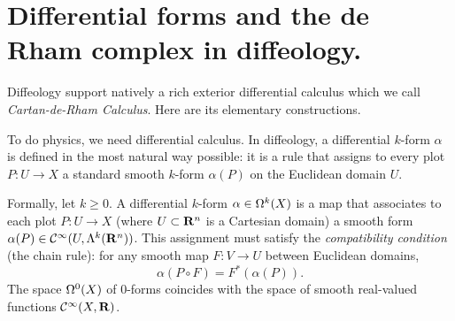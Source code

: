 \documentclass[10pt,reqno,letterpaper,twoside]{amsbook}
\begin{document}
  \section{Differential forms and the de Rham complex in diffeology.}
  \label{sec:Differential forms and the de Rham complex in diffeology}
  
  Diffeology support natively a rich exterior differential calculus which we call \emph{Cartan-de-Rham Calculus}.
  Here are its elementary constructions.
  
  \begin{article}
    To do physics,
    we need differential calculus.
    In diffeology,
    a differential $k$-form $\alpha$ is defined in the most natural way possible:
    it is a rule that assigns to every plot $P: U \to X$ a standard smooth $k$-form $\alpha(P)$ on the Euclidean domain $U$.
    
    Formally,
    let $k \geq 0$.
    A differential $k$-form $\alpha \in \Omega^k(X)$ is a map that associates to each plot $P: U \to X$ (where $U \subset {\mathbf{R}}^n$ is a Cartesian domain) a smooth form $\alpha(P) \in {\mathcal{C}}^\infty(U, \Lambda^k({\mathbf{R}}^n))$.
    This assignment must satisfy the \emph{compatibility condition} (the chain rule):
    for any smooth map $F: V \to U$ between Euclidean domains,
    \[
      \alpha(P \circ F) = F^*(\alpha(P)).
      \]
    The space $\Omega^0(X)$ of $0$-forms coincides with the space of smooth real-valued functions ${\mathcal{C}}^\infty(X, {\mathbf{R}})$.
    
  \end{article}
\end{document}
